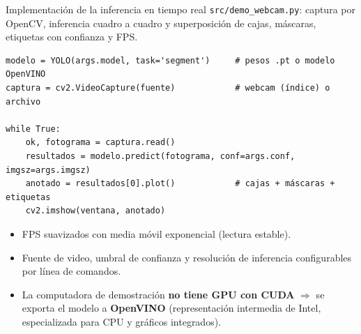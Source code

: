 \documentclass[aspectratio=169,11pt]{beamer}
\begin{document}
\begin{frame}[fragile]{Implementación de la inferencia en tiempo real}
  \texttt{src/demo\_webcam.py}: captura por OpenCV, inferencia cuadro a cuadro y
  superposición de cajas, máscaras, etiquetas con confianza y FPS.

  \vspace{0.5em}
\begin{lstlisting}[style=py]
modelo = YOLO(args.model, task='segment')     # pesos .pt o modelo OpenVINO
captura = cv2.VideoCapture(fuente)            # webcam (índice) o archivo

while True:
    ok, fotograma = captura.read()
    resultados = modelo.predict(fotograma, conf=args.conf, imgsz=args.imgsz)
    anotado = resultados[0].plot()            # cajas + máscaras + etiquetas
    cv2.imshow(ventana, anotado)
\end{lstlisting}

  \vspace{0.4em}
  \begin{itemize}\footnotesize
    \item FPS suavizados con media móvil exponencial (lectura estable).
    \item Fuente de video, umbral de confianza y resolución de inferencia configurables
          por línea de comandos.
    \item La computadora de demostración \textbf{no tiene GPU con CUDA} $\Rightarrow$
          se exporta el modelo a \textbf{OpenVINO} (representación intermedia de Intel,
          especializada para CPU y gráficos integrados).
  \end{itemize}
\end{frame}
\end{document}
